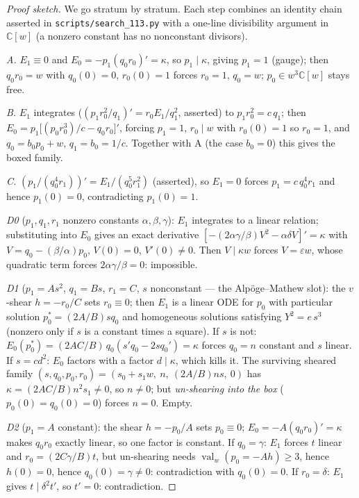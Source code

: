 \documentclass[11pt]{article}
\theoremstyle{definition}
\theoremstyle{remark}
\newcommand{\C}{\mathbb{C}}
\newcommand{\val}{\operatorname{val}}
\begin{document}
\begin{proof}[Proof sketch]
We go stratum by stratum. Each step combines an identity chain
asserted in \texttt{scripts/search\_113.py} with a one-line
divisibility argument in $\C[w]$ (a nonzero constant has no
nonconstant divisors).

\emph{A.} $E_1 \equiv 0$ and $E_0 = -p_1(q_0r_0)' = \kappa$, so
$p_1 \mid \kappa$, giving $p_1 = 1$ (gauge); then $q_0r_0 = w$ with
$q_0(0) = 0$, $r_0(0) = 1$ forces $r_0 = 1$, $q_0 = w$; $p_0 \in
w^3\C[w]$ stays free.

\emph{B.} $E_1$ integrates ($(p_1r_0^2/q_1)' = r_0E_1/q_1^2$, asserted)
to $p_1r_0^2 = c\,q_1$; then
$E_0 = p_1\bigl[(p_0r_0^3)/c - q_0r_0\bigr]'$, forcing $p_1 = 1$,
$r_0 \mid w$ with $r_0(0)=1$ so $r_0 = 1$, and $q_0 = b_0p_0 + w$,
$q_1 = b_0 = 1/c$. Together with A (the case $b_0 = 0$) this gives the
boxed family.

\emph{C.} $(p_1/(q_0^4r_1))' = E_1/(q_0^5r_1^2)$ (asserted), so
$E_1 = 0$ forces $p_1 = c\,q_0^4r_1$ and hence $p_1(0) = 0$,
contradicting $p_1(0) = 1$.

\emph{D0} ($p_1,q_1,r_1$ nonzero constants $\alpha,\beta,\gamma$):
$E_1$ integrates to a linear relation; substituting into $E_0$ gives an
exact derivative $[-(2\alpha\gamma/\beta)V^2 - \alpha\delta V]' =
\kappa$ with $V = q_0 - (\beta/\alpha)p_0$, $V(0)=0$, $V'(0)\ne0$. Then
$V \mid \kappa w$ forces $V = \varepsilon w$, whose quadratic term
forces $2\alpha\gamma/\beta = 0$: impossible.

\emph{D1} ($p_1 = As^2$, $q_1 = Bs$, $r_1 = C$, $s$ nonconstant --- the
Alp\"oge--Mathew slot): the $v$-shear $h = -r_0/C$ sets $r_0 \equiv 0$;
then $E_1$ is a linear ODE for $p_0$ with particular solution
$p_0^* = (2A/B)sq_0$ and homogeneous solutions satisfying
$Y^2 = e\,s^3$ (nonzero only if $s$ is a constant times a square). If
$s$ is not: $E_0(p_0^*) = (2AC/B)\,q_0(s'q_0 - 2sq_0') = \kappa$ forces
$q_0 = n$ constant and $s$ linear. If $s = cd^2$: $E_0$ factors with a
factor $d \mid \kappa$, which kills it. The surviving sheared family
$(s, q_0, p_0, r_0) = (s_0 + s_1w,\ n,\ (2A/B)ns,\ 0)$ has
$\kappa = (2AC/B)n^2s_1 \ne 0$, so $n \ne 0$; but \emph{un-shearing
into the box} ($p_0(0) = q_0(0) = 0$) forces $n = 0$. Empty.

\emph{D2} ($p_1 = A$ constant): the shear $h = -p_0/A$ sets
$p_0 \equiv 0$; $E_0 = -A(q_0r_0)' = \kappa$ makes $q_0r_0$ exactly
linear, so one factor is constant. If $q_0 = \gamma$: $E_1$ forces $t$
linear and $r_0 = (2C\gamma/B)t$, but un-shearing needs
$\val_w(p_0 = -Ah) \ge 3$, hence $h(0) = 0$, hence $q_0(0) = \gamma \ne
0$: contradiction with $q_0(0)=0$. If $r_0 = \delta$: $E_1$ gives
$t \mid \delta^2t'$, so $t' = 0$: contradiction.


\end{proof}
\end{document}
